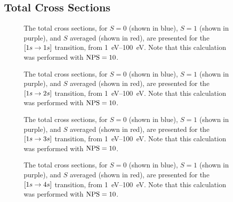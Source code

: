 \documentclass{article}
\begin{document}
\clearpage

\subsection{Total Cross Sections}
\label{sec:tcs}

\begin{figure}[h]
  \begin{center}
    
  \end{center}
  \caption[Total Cross Sections for $\lrsq{1s \to 1s}$]{
    The total cross sections, for $S = 0$ (shown in blue), $S = 1$ (shown in
    purple), and $S$ averaged (shown in red), are presented for the
    $\lrsq{1s \to 1s}$ transition, from \SIrange{1}{100}{\eV}.
    Note that this calculation was performed with $\rm{NPS} = 10$.
  }
  \label{fig:tcs-1s}
\end{figure}

\begin{figure}[h]
  \begin{center}
    
  \end{center}
  \caption[Total Cross Sections for $\lrsq{1s \to 2s}$]{
    The total cross sections, for $S = 0$ (shown in blue), $S = 1$ (shown in
    purple), and $S$ averaged (shown in red), are presented for the
    $\lrsq{1s \to 2s}$ transition, from \SIrange{1}{100}{\eV}.
    Note that this calculation was performed with $\rm{NPS} = 10$.
  }
  \label{fig:tcs-2s}
\end{figure}

\begin{figure}[h]
  \begin{center}
    
  \end{center}
  \caption[Total Cross Sections for $\lrsq{1s \to 3s}$]{
    The total cross sections, for $S = 0$ (shown in blue), $S = 1$ (shown in
    purple), and $S$ averaged (shown in red), are presented for the
    $\lrsq{1s \to 3s}$ transition, from \SIrange{1}{100}{\eV}.
    Note that this calculation was performed with $\rm{NPS} = 10$.
  }
  \label{fig:tcs-3s}
\end{figure}

\begin{figure}[h]
  \begin{center}
    
  \end{center}
  \caption[Total Cross Sections for $\lrsq{1s \to 4s}$]{
    The total cross sections, for $S = 0$ (shown in blue), $S = 1$ (shown in
    purple), and $S$ averaged (shown in red), are presented for the
    $\lrsq{1s \to 4s}$ transition, from \SIrange{1}{100}{\eV}.
    Note that this calculation was performed with $\rm{NPS} = 10$.
  }
  \label{fig:tcs-4s}
\end{figure}
\end{document}
